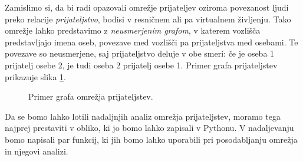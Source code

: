 Zamislimo si, da bi radi opazovali omrežje prijateljev oziroma povezanost ljudi preko relacije \emph{prijateljstvo}, bodisi v resničnem ali pa virtualnem življenju. Tako omrežje lahko predstavimo z \emph{neusmerjenim grafom}, v katerem vozlišča predstavljajo imena oseb, povezave med vozlišči pa prijateljstva med osebami. Te povezave so neusmerjene, saj prijateljstvo deluje v obe smeri: če je oseba 1 prijatelj osebe 2, je tudi oseba 2 prijatelj osebe 1. Primer grafa prijateljstev prikazuje slika \ref{img:prijatelji}.
\begin{figure}
    \centering
    \caption{Primer grafa omrežja prijateljstev.}
    \label{img:prijatelji}
\end{figure}

Da se bomo lahko lotili nadaljnjih analiz omrežja prijateljstev, moramo tega najprej prestaviti v obliko, ki jo bomo lahko zapisali v Pythonu. V nadaljevanju bomo napisali par funkcij, ki jih bomo lahko uporabili pri posodabljanju omrežja in njegovi analizi.

